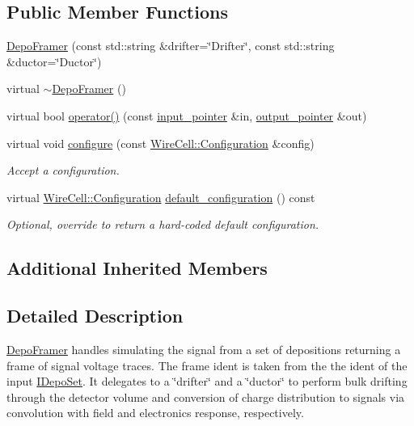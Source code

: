 \subsection*{Public Member Functions}
\begin{DoxyCompactItemize}
\item 
\hyperlink{class_wire_cell_1_1_gen_1_1_depo_framer_a3e9b79b211fdff52e2f20cfa0956c298}{Depo\+Framer} (const std\+::string \&drifter=\char`\"{}Drifter\char`\"{}, const std\+::string \&ductor=\char`\"{}Ductor\char`\"{})
\item 
virtual \hyperlink{class_wire_cell_1_1_gen_1_1_depo_framer_a34ad1abcd0b204c1b7baf2fb454dda5a}{$\sim$\+Depo\+Framer} ()
\item 
virtual bool \hyperlink{class_wire_cell_1_1_gen_1_1_depo_framer_a6ad456e0ccd9361b047b5f3f8b89fbd6}{operator()} (const \hyperlink{class_wire_cell_1_1_i_function_node_a55c0946156df9b712b8ad1a0b59b2db6}{input\+\_\+pointer} \&in, \hyperlink{class_wire_cell_1_1_i_function_node_afc02f1ec60d31aacddf64963f9ca650b}{output\+\_\+pointer} \&out)
\item 
virtual void \hyperlink{class_wire_cell_1_1_gen_1_1_depo_framer_a3e476a422c8e5e56662d4040c0fdac69}{configure} (const \hyperlink{namespace_wire_cell_a9f705541fc1d46c608b3d32c182333ee}{Wire\+Cell\+::\+Configuration} \&config)
\begin{DoxyCompactList}\small\item\em Accept a configuration. \end{DoxyCompactList}\item 
virtual \hyperlink{namespace_wire_cell_a9f705541fc1d46c608b3d32c182333ee}{Wire\+Cell\+::\+Configuration} \hyperlink{class_wire_cell_1_1_gen_1_1_depo_framer_adee1889f1ab532a31f8ae66e149ee8a4}{default\+\_\+configuration} () const
\begin{DoxyCompactList}\small\item\em Optional, override to return a hard-\/coded default configuration. \end{DoxyCompactList}\end{DoxyCompactItemize}
\subsection*{Additional Inherited Members}


\subsection{Detailed Description}
\hyperlink{class_wire_cell_1_1_gen_1_1_depo_framer}{Depo\+Framer} handles simulating the signal from a set of depositions returning a frame of signal voltage traces. The frame ident is taken from the the ident of the input \hyperlink{class_wire_cell_1_1_i_depo_set}{I\+Depo\+Set}. It delegates to a \char`\"{}drifter\char`\"{} and a \char`\"{}ductor\char`\"{} to perform bulk drifting through the detector volume and conversion of charge distribution to signals via convolution with field and electronics response, respectively.

